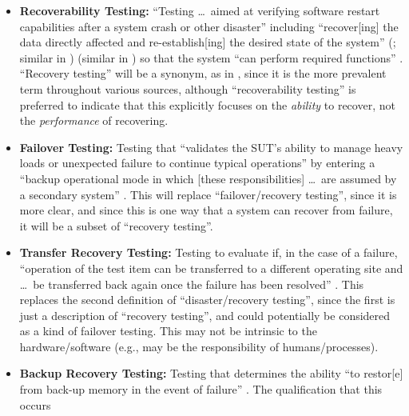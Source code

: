 \begin{itemize}
    \item \textbf{Recoverability Testing:} ``Testing \dots\ aimed at
          verifying software restart capabilities after a system crash or
          other disaster'' \citep[p.~5-9]{SWEBOK2024} including ``recover[ing]
          the data directly affected and re-establish[ing] the desired state
          of the system''
          \ifnotpaper
              (\citealp{ISO_IEC2023a}; similar in \citealp[p.~7-10]{SWEBOK2024})
          \else
              \cite{ISO_IEC2023a} (similar in \cite[p.~7-10]{SWEBOK2024})
          \fi so that the system ``can perform
          required functions'' \citep[p.~370]{IEEE2017}. ``Recovery testing''
          will be a synonym, as in \citep[p.~47]{Kam2008}, since it is the
          more prevalent term throughout various sources, although
          ``recoverability testing'' is preferred to indicate that this
          explicitly focuses on the \emph{ability} to
          recover, not the \emph{performance} of recovering.
    \item \textbf{Failover Testing:} Testing that ``validates the SUT's
          ability to manage heavy loads or unexpected failure to continue
          typical operations'' \cite[p.~5-9]{SWEBOK2024} by entering a
          ``backup operational mode in which [these responsibilities] \dots\
          are assumed by a secondary system'' \citepISTQB{}. This will
          replace ``failover/recovery testing'', since it is more clear, and
          since this is one way that a system can recover from failure, it
          will be a subset of ``recovery testing''.
    \item \textbf{Transfer Recovery Testing:} Testing to evaluate if,
          in the case of a failure, ``operation of the test item can be
          transferred to a different operating site and \dots\ be transferred
          back again once the failure has been resolved''
          \citeyearpar[p.~37]{IEEE2021}. This replaces the second definition
          of ``disaster/recovery testing'', since the first is just a
          description of ``recovery testing'', and could potentially be
          considered as a kind of failover testing. This may not be
          intrinsic to the hardware/software (e.g., may be the responsibility
          of humans/processes).
    \item \textbf{Backup Recovery Testing:} Testing that determines the
          ability ``to restor[e] from back-up memory in the event of failure''
          \citep[p.~37]{IEEE2021}. The qualification that this occurs

\end{itemize}
